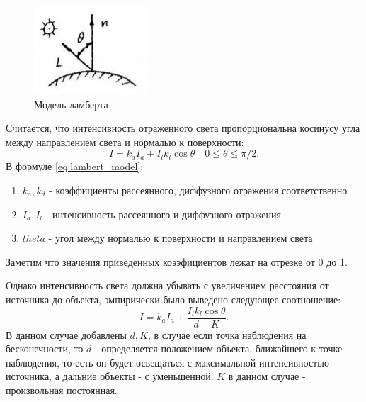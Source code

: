 \documentclass[a4paper,14pt, unknownkeysallowed]{extreport}
\begin{document}
\begin{figure}[h]
	\centering
	\includegraphics{lambert_model}
	\caption{Модель ламберта}
	\label{fig:lambert_model}
\end{figure}

Считается, что интенсивность отраженного света
пропорциональна косинусу угла между направлением света и нормалью к поверхности:
\begin{equation} 
	I = k_aI_a + I_lk_l\cos\theta \quad 0 \leq \theta \leq \pi/2.
	\label{eq:lambert_model}
\end{equation}
В  формуле \ref{eq:lambert_model}:
\begin{enumerate}
	\item $k_a,k_d$ - коэффициенты рассеянного, диффузного отражения соответственно
	\item $I_a,I_l$ - интенсивность рассеянного и диффузного отражения 
	\item $theta$ - угол между нормалью к поверхности и направлением света
\end{enumerate}
Заметим что значения приведенных коээфициентов лежат на отрезке от 0 до 1.

Однако интенсивность света должна убывать с увеличением расстояния от источника до объекта, эмпирически было выведено следующее соотношение:
\begin{equation} 
	I = k_aI_a + \frac{I_lk_l\cos\theta}{d + K}.
	\label{eq:lambert_model_space}
\end{equation}
В данном случае добавлены $d,K$, в случае если точка наблюдения на бесконечности, то $d$ - определяется положением объекта,
ближайшего к точке наблюдения, то есть он будет освещаться с максимальной интенсивностью источника, а дальние объекты - с уменьшенной.
$K$ в данном случае - произвольная постоянная. \cite{Rodgers}
\end{document}
